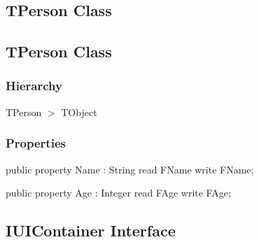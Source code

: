 \documentclass{report}
\newif\ifpdf
\begin{document}
\subsection*{\large{\textbf{TPerson Class}}\normalsize\hspace{1ex}\hrulefill}
\else
\subsection*{TPerson Class}
\fi
\label{ok_attributes.TPerson}
\subsubsection*{\large{\textbf{Hierarchy}}\normalsize\hspace{1ex}\hfill}
TPerson {$>$} TObject
\subsubsection*{\large{\textbf{Properties}}\normalsize\hspace{1ex}\hfill}
\begin{list}{}{
\setlength{\itemindent}{0cm}
\setlength{\listparindent}{0cm}
\setlength{\leftmargin}{\evensidemargin}
\addtolength{\leftmargin}{\tmplength}
\settowidth{\labelsep}{X}
\addtolength{\leftmargin}{\labelsep}
\setlength{\labelwidth}{\tmplength}
}
\label{ok_attributes.TPerson-Name}
\item[\textbf{Name}\hfill]
\ifpdf
\begin{flushleft}
\fi
\begin{ttfamily}
public property Name : String read FName write FName;\end{ttfamily}

\ifpdf
\end{flushleft}
\fi


\par  \label{ok_attributes.TPerson-Age}
\item[\textbf{Age}\hfill]
\ifpdf
\begin{flushleft}
\fi
\begin{ttfamily}
public property Age : Integer read FAge write FAge;\end{ttfamily}

\ifpdf
\end{flushleft}
\fi


\par  \end{list}
\ifpdf
\subsection*{\large{\textbf{IUIContainer Interface}}\normalsize\hspace{1ex}\hrulefill}
\else
\end{document}
